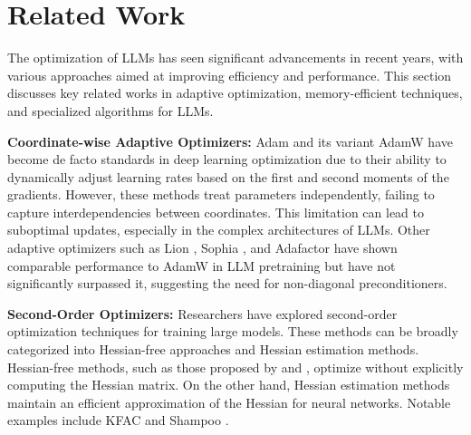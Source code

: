 \section{Related Work}

The optimization of LLMs has seen significant advancements in recent years, with various approaches aimed at improving efficiency and performance. This section discusses key related works in adaptive optimization, memory-efficient techniques, and specialized algorithms for LLMs.

\noindent\textbf{Coordinate-wise Adaptive Optimizers:} Adam \citep{kingma2014adam} and its variant AdamW \citep{loshchilov2017decoupled} have become de facto standards in deep learning optimization due to their ability to dynamically adjust learning rates based on the first and second moments of the gradients. However, these methods treat parameters independently, failing to capture interdependencies between coordinates. This limitation can lead to suboptimal updates, especially in the complex architectures of LLMs. Other adaptive optimizers such as Lion \citep{chen2023symbolic}, Sophia \citep{liu2023sophia}, and Adafactor \citep{shazeer2018adafactor,zhai2022scaling} have shown comparable performance to AdamW in LLM pretraining but have not significantly surpassed it, suggesting the need for non-diagonal preconditioners.

\noindent\textbf{Second-Order Optimizers:} Researchers have explored second-order optimization techniques for training large models. These methods can be broadly categorized into Hessian-free approaches and Hessian estimation methods. Hessian-free methods, such as those proposed by \citet{martens2010deep} and \citet{martens2015optimizing}, optimize without explicitly computing the Hessian matrix. On the other hand, Hessian estimation methods maintain an efficient approximation of the Hessian for neural networks. Notable examples include KFAC \citep{martens2015optimizing} and Shampoo \citep{gupta2018shampoo}.

